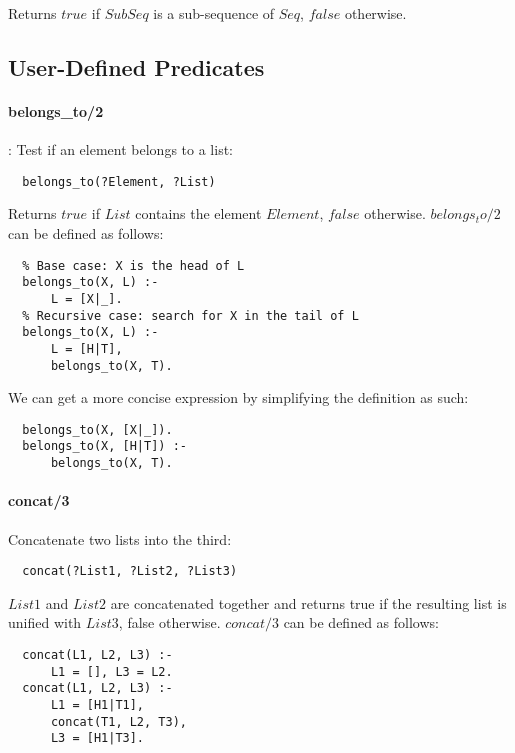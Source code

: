 \documentclass{article}
\begin{document}
\begin{multicols}{2}
  Returns $true$ if $SubSeq$ is a sub-sequence of $Seq$, $false$ otherwise.
  
  \subsection{User-Defined Predicates}

  \paragraph{belongs\_to/2}: Test if an element belongs to a list:
  
  \begin{lstlisting}
  belongs_to(?Element, ?List)
  \end{lstlisting} 
  
  Returns $true$ if $List$ contains the element $Element$, $false$ otherwise. $belongs_to/2$ can be defined as follows:

  \begin{lstlisting}
  % Base case: X is the head of L
  belongs_to(X, L) :-
      L = [X|_].
  % Recursive case: search for X in the tail of L
  belongs_to(X, L) :-
      L = [H|T],
      belongs_to(X, T).
  \end{lstlisting} 
  
  We can get a more concise expression by simplifying the definition as such:

  \begin{lstlisting}
  belongs_to(X, [X|_]).
  belongs_to(X, [H|T]) :-
      belongs_to(X, T).
  \end{lstlisting} 
  
  \paragraph{concat/3} Concatenate two lists into the third:
  
  \begin{lstlisting}
  concat(?List1, ?List2, ?List3)
  \end{lstlisting} 
  
  $List1$ and $List2$ are concatenated together and returns true if the resulting list is unified with $List3$, false otherwise. $concat/3$ can be defined as follows:

  \begin{lstlisting}
  concat(L1, L2, L3) :-
      L1 = [], L3 = L2.
  concat(L1, L2, L3) :- 
      L1 = [H1|T1],
      concat(T1, L2, T3),
      L3 = [H1|T3].
  \end{lstlisting} 
  

\end{multicols}
\end{document}
